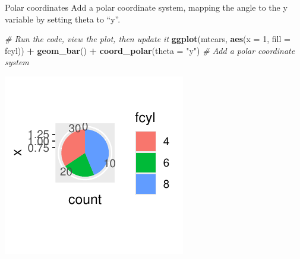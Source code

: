 \documentclass[
  ignorenonframetext,
]{beamer}
\newenvironment{Shaded}{\begin{snugshade}}{\end{snugshade}}
\newcommand{\AttributeTok}[1]{\textcolor[rgb]{0.13,0.29,0.53}{#1}}
\newcommand{\CommentTok}[1]{\textcolor[rgb]{0.56,0.35,0.01}{\textit{#1}}}
\newcommand{\DecValTok}[1]{\textcolor[rgb]{0.00,0.00,0.81}{#1}}
\newcommand{\FunctionTok}[1]{\textcolor[rgb]{0.13,0.29,0.53}{\textbf{#1}}}
\newcommand{\NormalTok}[1]{#1}
\newcommand{\SpecialCharTok}[1]{\textcolor[rgb]{0.81,0.36,0.00}{\textbf{#1}}}
\newcommand{\StringTok}[1]{\textcolor[rgb]{0.31,0.60,0.02}{#1}}
\begin{document}
\begin{frame}[fragile]{Polar coordinates}
\label{polar-coordinates-4}
Add a polar coordinate system, mapping the angle to the y variable by
setting theta to ``y''.


\begin{Shaded}
\begin{Highlighting}[]
\CommentTok{\# Run the code, view the plot, then update it}
\FunctionTok{ggplot}\NormalTok{(mtcars, }\FunctionTok{aes}\NormalTok{(}\AttributeTok{x =} \DecValTok{1}\NormalTok{, }\AttributeTok{fill =}\NormalTok{ fcyl)) }\SpecialCharTok{+} \FunctionTok{geom\_bar}\NormalTok{() }\SpecialCharTok{+} \FunctionTok{coord\_polar}\NormalTok{(}\AttributeTok{theta =} \StringTok{"y"}\NormalTok{)  }\CommentTok{\# Add a polar coordinate system}
\end{Highlighting}
\end{Shaded}

\begin{center}\includegraphics[width=0.5\linewidth]{Figs/unnamed-chunk-66-1} \end{center}
\end{frame}
\end{document}
